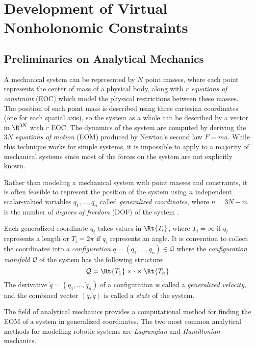 

\chapter{Development of Virtual Nonholonomic Constraints}

\section{Preliminaries on Analytical Mechanics}
A mechanical system can be represented by \(N\) point masses, where each point
represents the center of mass of a physical body, along with \(r\)
\textit{equations of constraint} (EOC) which model the physical restrictions
between these masses.
The position of each point mass is described using three cartesian coordinates (one
for each spatial axis), so the system as a whole can be described by a vector in
\(\R^{3N}\) with \(r\) EOC. 
The dynamics of the system are computed by deriving the \(3N\)
\textit{equations of motion} (EOM) produced by Newton's second law \(F = m a\).
While this technique works for simple systems, it is impossible to
apply to a majority of mechanical systems since most of the forces 
on the system are not explicitly known. 

Rather than modeling a mechanical system with point masses and constraints,
it is often feasible to represent the position of the system using \(n\)
independent scalar-valued variables \(q_1,\ldots,q_n\) called 
\textit{generalized coordinates}, where \(n = 3N - m\) is the number of
\textit{degrees of freedom} (DOF) of the system \cite{greenwood_dynamics}.

Each generalized coordinate \(q_i\) takes values in \(\Rt{T_i}\), where
\(T_i = \infty\) if \(q_i\) represents a length or \(T_i = 2\pi\) if \(q_i\)
represents an angle.
It is convention to collect the coordinates into a \textit{configuration} 
\(q = (q_1,\ldots,q_n) \in \mathcal{Q}\) 
where the \textit{configuration manifold} \(\mathcal{Q}\) of the system has the
following structure:
\[
    \mathcal{Q} = \Rt{T_1} \times \cdot \times \Rt{T_n}
\] 
The derivative \(\dot{q} = (\dot{q}_1,\ldots,\dot{q}_n)\) of a configuration
is called a \textit{generalized velocity}, and the combined vector
\((q,\dot{q})\) is called a \textit{state} of the system.

The field of analytical mechanics provides a computational method for finding
the EOM of a system in generalized coordinates. The two most common analytical
methods for modelling robotic systems are \textit{Lagrangian} and
\textit{Hamiltonian} mechanics.

